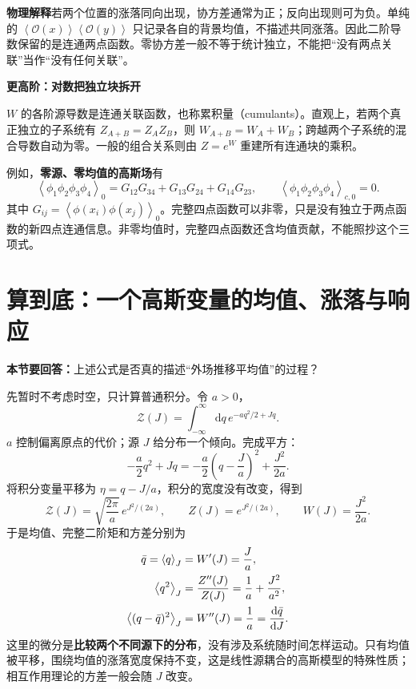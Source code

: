 \documentclass[11pt,a4paper]{article}
\newcommand{\dd}{\mathrm d}
\newcommand{\OO}{\mathcal O}
\newcommand{\ZZ}{\mathcal Z}
\newcommand{\avg}[1]{\left\langle #1\right\rangle}
\newcommand{\physicsnote}[1]{\par\smallskip\noindent\colorbox{pale}{\parbox{\dimexpr\linewidth-2\fboxsep\relax}{\textbf{物理解释}\quad #1}}\par\smallskip}
\newcommand{\question}[1]{\textbf{本节要回答：}#1\par}
\newcommand{\step}[1]{\textbf{#1}\par}
\begin{document}
\physicsnote{若两个位置的涨落同向出现，协方差通常为正；反向出现则可为负。单纯的 \(\avg{\OO(x)}\avg{\OO(y)}\) 只记录各自的背景均值，不描述共同涨落。因此二阶导数保留的是连通两点函数。零协方差一般不等于统计独立，不能把“没有两点关联”当作“没有任何关联”。}

\step{更高阶：对数把独立块拆开}
\(W\) 的各阶源导数是连通关联函数，也称累积量（cumulants）。直观上，若两个真正独立的子系统有
\(Z_{A+B}=Z_AZ_B\)，则 \(W_{A+B}=W_A+W_B\)；跨越两个子系统的混合导数自动为零。一般的组合关系则由 \(Z=e^W\) 重建所有连通块的乘积。

例如，\textbf{零源、零均值的高斯场}有
\begin{equation}
 \avg{\phi_1\phi_2\phi_3\phi_4}_0
 =G_{12}G_{34}+G_{13}G_{24}+G_{14}G_{23},\qquad
 \avg{\phi_1\phi_2\phi_3\phi_4}_{c,0}=0.
\end{equation}
其中 \(G_{ij}=\avg{\phi(x_i)\phi(x_j)}_0\)。完整四点函数可以非零，只是没有独立于两点函数的新四点连通信息。非零均值时，完整四点函数还含均值贡献，不能照抄这个三项式。

\newpage
\section{算到底：一个高斯变量的均值、涨落与响应}
\question{上述公式是否真的描述“外场推移平均值”的过程？}
先暂时不考虑时空，只计算普通积分。令 \(a>0\)，
\begin{equation}
 \ZZ(J)=\int_{-\infty}^{\infty}\dd q\,e^{-a q^2/2+Jq}.
\end{equation}
\(a\) 控制偏离原点的代价；源 \(J\) 给分布一个倾向。完成平方：
\begin{equation}
 -\frac a2q^2+Jq=-\frac a2\left(q-\frac Ja\right)^2+\frac{J^2}{2a}.
\end{equation}
将积分变量平移为 \(\eta=q-J/a\)，积分的宽度没有改变，得到
\begin{equation}
 \ZZ(J)=\sqrt{\frac{2\pi}{a}}\,e^{J^2/(2a)},\qquad
 Z(J)=e^{J^2/(2a)},\qquad W(J)=\frac{J^2}{2a}.
\end{equation}
于是均值、完整二阶矩和方差分别为
\begin{align}
 \bar q=\avg q_J&=W'(J)=\frac Ja,\notag\\
 \avg{q^2}_J&=\frac{Z''(J)}{Z(J)}=\frac1a+\frac{J^2}{a^2},\notag\\
 \avg{(q-\bar q)^2}_J&=W''(J)=\frac1a
 =\frac{\dd\bar q}{\dd J}.\label{eq:gaussianResponse}
\end{align}
这里的微分是\textbf{比较两个不同源下的分布}，没有涉及系统随时间怎样运动。只有均值被平移，围绕均值的涨落宽度保持不变，这是线性源耦合的高斯模型的特殊性质；相互作用理论的方差一般会随 \(J\) 改变。
\end{document}
